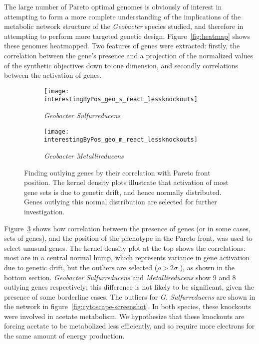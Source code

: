 \documentclass[a4paper,11pt]{article}
\begin{document}
The large number of Pareto optimal genomes is obviously of interest in attempting to form a more complete understanding of the implications of the metabolic network structure of the {\it Geobacter} species studied, and therefore in attempting to perform more targeted genetic design. Figure~\ref{fig:heatmap} shows these genomes heatmapped. Two features of genes were extracted: firstly, the correlation between the gene’s presence and a projection of the normalized values of the synthetic objectives down to one dimension, and secondly correlations between the activation of genes. 

\begin{figure}[!htb]
	\begin{subfigure}[htb]{\textwidth}
                \texttt{[image: interestingByPos\_geo\_s\_react\_lessknockouts]}
                \caption{\it Geobacter Sulfurreducens}
                \label{fig:outlyinggenes:sul}
	\end{subfigure}
	\begin{subfigure}[htb]{\textwidth}
                \texttt{[image: interestingByPos\_geo\_m\_react\_lessknockouts]}
                \caption{\it Geobacter Metallireducens}
                \label{fig:outlyinggenes:met}
	\end{subfigure}
	\caption{Finding outlying genes by their correlation with Pareto front position. The kernel density plots illustrate that activation of most gene sets is due to genetic drift, and hence normally distributed. Genes outlying this normal distribution are selected for further investigation.}
	\label{fig:outlyinggenes}
\end{figure}

Figure~\ref{fig:outlyinggenes} shows how correlation between the presence of genes (or in some cases, sets of genes), and the position of the phenotype in the Pareto front, was used to select unusual genes. The kernel density plot at the top shows the correlations: most are in a central normal hump, which represents variance in gene activation due to genetic drift, but the outliers are selected (\( \rho > 2\sigma \) ), as shown in the bottom section. 
{\it Geobacter} {\it Sulfurreducens} and {\it Metallireducens} show 9 and 8 outlying genes respectively; this difference is not likely to be significant, given the presence of some borderline cases.
The outliers for {\it G. Sulfurreducens} are shown in the network in figure~\ref{fig:cytoscape-screenshot}. In both species, these knockouts were involved in acetate metabolism. We hypothesize that these knockouts are forcing acetate to be metabolized less efficiently, and so require more electrons for the same amount of energy production.
\end{document}
